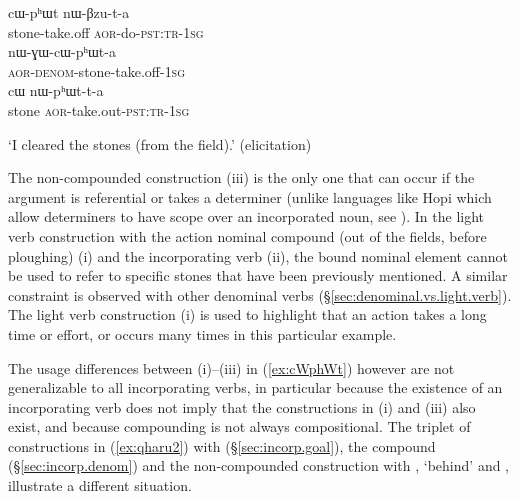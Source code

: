 \begin{exe}
\ex \label{ex:cWphWt}
\begin{xlist}[(ii)]
\gll  cɯ-pʰɯt nɯ-βzu-t-a  \\
  stone-take.off \textsc{aor}-do-\textsc{pst}:\textsc{tr}-\textsc{1sg} \\
\gll nɯ-ɣɯ-cɯ-pʰɯt-a \\
\textsc{aor}-\textsc{denom}-stone-take.off-\textsc{1sg} \\
\gll cɯ nɯ-pʰɯt-t-a  \\
  stone \textsc{aor}-take.out-\textsc{pst}:\textsc{tr}-\textsc{1sg} \\
\end{xlist}
\glt `I cleared the stones (from the field).' (elicitation)
\end{exe}   

The non-compounded construction (iii) is the only one that can occur if the argument is referential or takes a determiner (unlike languages like Hopi which allow determiners to have scope over an incorporated noun, see \citealt{hill.kc03hopi, haugen08incorp}). In the light verb construction with the action nominal compound  (out of the fields, before ploughing) (i) and the incorporating verb  (ii), the bound nominal element  cannot be used to refer to specific stones that have been previously mentioned. A similar constraint is observed with other denominal verbs (§\ref{sec:denominal.vs.light.verb}). The light verb construction (i) is used to highlight that an action takes a long time or effort, or occurs many times in this particular example. 

The usage differences between (i)--(iii) in (\ref{ex:cWphWt}) however are not generalizable to all incorporating verbs, in particular because the existence of an incorporating verb does not imply that the constructions in (i) and (iii) also exist, and because compounding is not always compositional. The triplet of constructions in (\ref{ex:qharu2}) with  (§\ref{sec:incorp.goal}), the compound  (§\ref{sec:incorp.denom}) and the non-compounded construction with  , `behind' and , illustrate a different situation.

